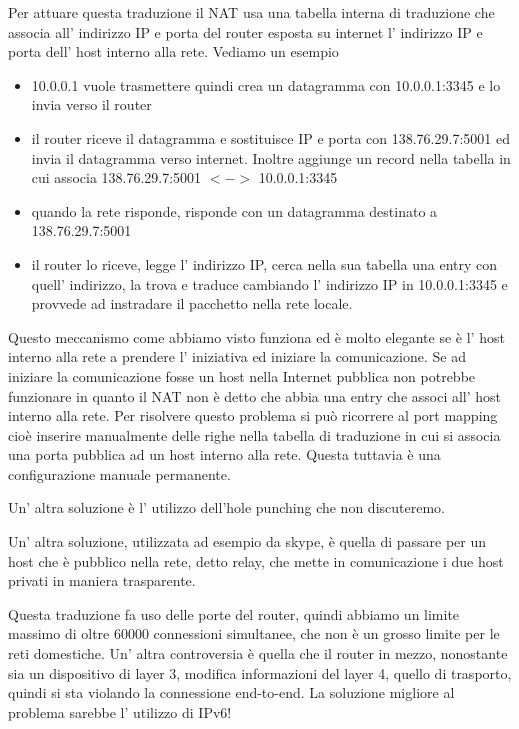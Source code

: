 Per attuare questa traduzione il NAT usa una tabella interna di traduzione che associa all' indirizzo IP e porta del router esposta su internet l' indirizzo IP e porta dell' host interno alla rete.
Vediamo un esempio
\begin{itemize}
    \item 10.0.0.1 vuole trasmettere quindi crea un datagramma con 10.0.0.1:3345 e lo invia verso il router
    \item il router riceve il datagramma e sostituisce IP e porta con 138.76.29.7:5001 ed invia il datagramma verso internet.
    Inoltre aggiunge un record nella tabella in cui associa  138.76.29.7:5001 $<->$ 10.0.0.1:3345
    \item quando la rete risponde, risponde con un datagramma destinato a \\ 138.76.29.7:5001
    \item il router lo riceve, legge l' indirizzo IP, cerca nella sua tabella una entry con quell' indirizzo, la trova e traduce cambiando l' indirizzo IP in 10.0.0.1:3345 e provvede ad instradare il pacchetto nella rete locale.
\end{itemize}

Questo meccanismo come abbiamo visto funziona ed è molto elegante se è l' host interno alla rete a prendere l' iniziativa ed iniziare la comunicazione.
Se ad iniziare la comunicazione fosse un host nella Internet pubblica non potrebbe funzionare in quanto il NAT non è detto che abbia una entry che associ all' host interno alla rete.
Per risolvere questo problema si può ricorrere al port mapping cioè inserire manualmente delle righe nella tabella di traduzione in cui si associa una porta pubblica ad un host interno alla rete.
Questa tuttavia è una configurazione manuale permanente.

Un' altra soluzione è l' utilizzo dell'hole punching che non discuteremo.

Un' altra soluzione, utilizzata ad esempio da skype, è quella di passare per un host che è pubblico nella rete, detto relay, che mette in comunicazione i due host privati in maniera trasparente.

Questa traduzione fa uso delle porte del router, quindi abbiamo un limite massimo di oltre 60000 connessioni simultanee, che non è un grosso limite per le reti domestiche.
Un' altra controversia è quella che il router in mezzo, nonostante sia un dispositivo di layer 3, modifica informazioni del layer 4, quello di trasporto, quindi si sta violando la connessione end-to-end.
La soluzione migliore al problema sarebbe l' utilizzo di IPv6!

